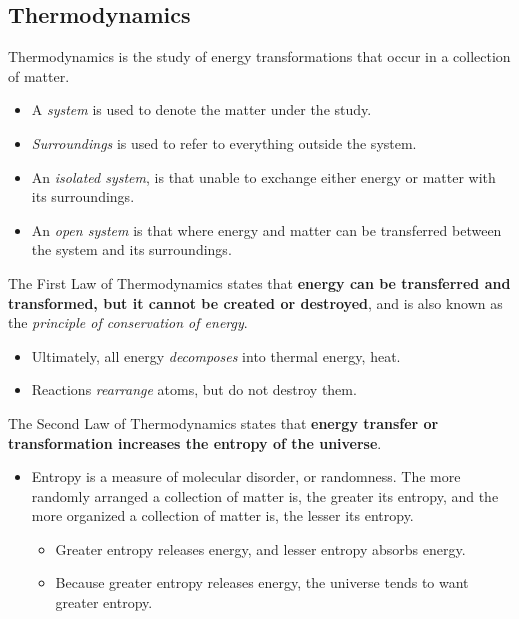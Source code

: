 \documentclass[a4paper]{article}
\begin{document}
\subsection{Thermodynamics}
\color{red}Thermodynamics \color{black} is the study of energy transformations that occur in a collection of matter.
\begin{itemize}
	\item A \textit{system} is used to denote the matter under the study.
	\item \textit{Surroundings} is used to refer to everything outside the system.
	\item An \textit{isolated system}, is that unable to exchange either energy or matter with its surroundings.
	\item An \textit{open system} is that where energy and matter can be transferred between the system and its surroundings.\\
\end{itemize}

\color{red}The First Law of Thermodynamics \color{black} states that \textbf{energy can be transferred and transformed, but it cannot be created or destroyed}, and is also known as the \textit{principle of conservation of energy}.

\begin{itemize}
	\item Ultimately, all energy \textit{decomposes} into thermal energy, heat.
	\item Reactions \textit{rearrange} atoms, but do not destroy them.
\end{itemize}

\color{red}The Second Law of Thermodynamics \color{black} states that \textbf{energy transfer or transformation increases the entropy of the universe}.
\begin{itemize}
	\item \color{red}Entropy \color{black} is a measure of molecular disorder, or randomness. The more randomly arranged a collection of matter is, the greater its entropy, and the more organized a collection of matter is, the lesser its entropy.
		\begin{itemize}
			\item Greater entropy releases energy, and lesser entropy absorbs energy. 
			\item Because greater entropy releases energy, the universe tends to want greater entropy.
		\end{itemize}
\end{itemize}
\end{document}
